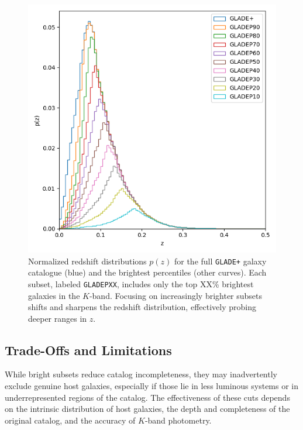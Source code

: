 \begin{figure}[h!]
  \centering
  \includegraphics[width=0.7\linewidth]{figures/z_dist_perc.png}
  \caption[Normalized redshift distributions $p(z)$ for the \texttt{GLADE+} galaxy catalogue and the brightest percentiles.]{Normalized redshift distributions $p(z)$ for the full \texttt{GLADE+} galaxy catalogue (blue) and the brightest percentiles (other curves). Each subset, labeled \texttt{GLADEPXX}, includes only the top XX\% brightest galaxies in the $K$-band. Focusing on increasingly brighter subsets shifts and sharpens the redshift distribution, effectively probing deeper ranges in $z$.}
  \label{fig:z_dist}
\end{figure}

\subsection{Trade-Offs and Limitations}

While bright subsets reduce catalog incompleteness, they may inadvertently exclude genuine host galaxies, especially if those lie in less luminous systems or in underrepresented regions of the catalog. The effectiveness of these cuts depends on the intrinsic distribution of host galaxies, the depth and completeness of the original catalog, and the accuracy of $K$-band photometry. 

